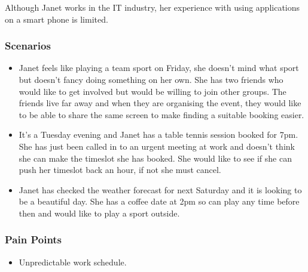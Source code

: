 Although Janet works in the IT industry, her experience with using
applications on a smart phone is limited.


\subsubsection*{Scenarios}
\label{ssub:working_scenarios}

\begin{itemize}
	\item Janet feels like playing a team sport on Friday, she doesn't mind
		what sport but doesn't fancy doing something on her own. She has two
		friends who would like to get involved but would be willing to join
		other groups. The friends live far away and when they are organising
		the event, they would like to be able to share the same screen to make
		finding a suitable booking easier.

	\item It's a Tuesday evening and Janet has a table tennis session booked
		for 7pm. She has just been called in to an urgent meeting at work and
		doesn't think she can make the timeslot she has booked. She would like
		to see if she can push her timeslot back an hour, if not she must
		cancel.

	\item Janet has checked the weather forecast for next Saturday and it is
		looking to be a beautiful day. She has a coffee date at 2pm so can play
		any time before then and would like to play a sport outside.
\end{itemize}


\subsubsection*{Pain Points}
\label{ssub:working_pain_points}

\begin{itemize}
	\item Unpredictable work schedule.
\end{itemize}


